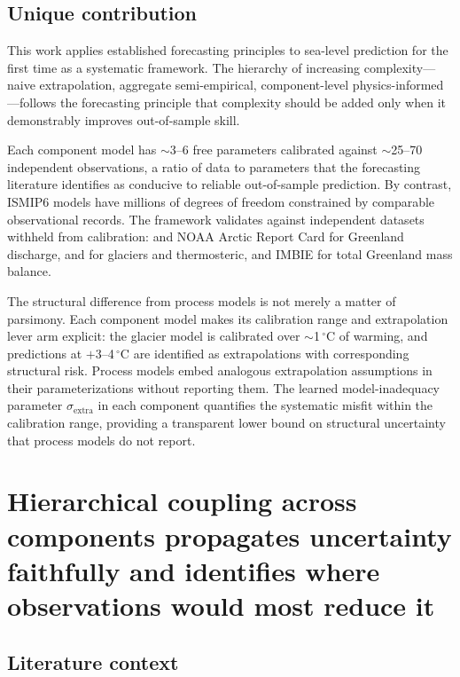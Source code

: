 \documentclass[11pt]{article}
\begin{document}
\subsection{Unique contribution}

This work applies established forecasting principles to sea-level prediction for the first time as a systematic framework. The hierarchy of increasing complexity---naive extrapolation, aggregate semi-empirical, component-level physics-informed---follows the forecasting principle that complexity should be added only when it demonstrably improves out-of-sample skill.

Each component model has $\sim$3--6 free parameters calibrated against $\sim$25--70 independent observations, a ratio of data to parameters that the forecasting literature identifies as conducive to reliable out-of-sample prediction. By contrast, ISMIP6 models have millions of degrees of freedom constrained by comparable observational records. The framework validates against independent datasets withheld from calibration: \citet{Mankoff2021} and NOAA Arctic Report Card for Greenland discharge, \citet{Frederikse2020} and \citet{Horwath2022} for glaciers and thermosteric, and IMBIE \citep{Otosaka2023} for total Greenland mass balance.

The structural difference from process models is not merely a matter of parsimony. Each component model makes its calibration range and extrapolation lever arm explicit: the glacier model is calibrated over $\sim$1$\,^\circ$C of warming, and predictions at $+3$--4$\,^\circ$C are identified as extrapolations with corresponding structural risk. Process models embed analogous extrapolation assumptions in their parameterizations without reporting them. The learned model-inadequacy parameter $\sigma_{\mathrm{extra}}$ in each component quantifies the systematic misfit within the calibration range, providing a transparent lower bound on structural uncertainty that process models do not report.

\section{Hierarchical coupling across components propagates uncertainty faithfully and identifies where observations would most reduce it}
\label{sec:takeaway_uncertainty}

\subsection{Literature context}
\end{document}

